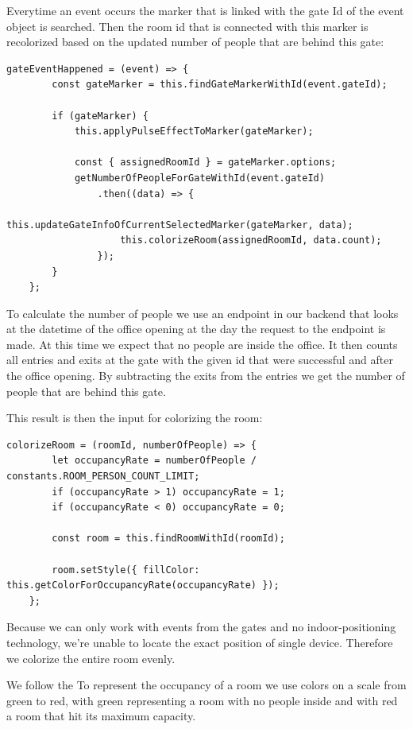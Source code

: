 Everytime an event occurs the marker that is linked with the gate Id of the event object is searched. Then the room id that is connected with this marker is recolorized based on the updated number of people that are behind this gate:

\begin{lstlisting}[label=gateEventHappened]
gateEventHappened = (event) => {
        const gateMarker = this.findGateMarkerWithId(event.gateId);

        if (gateMarker) {
            this.applyPulseEffectToMarker(gateMarker);

            const { assignedRoomId } = gateMarker.options;
            getNumberOfPeopleForGateWithId(event.gateId)
                .then((data) => {
                    this.updateGateInfoOfCurrentSelectedMarker(gateMarker, data);
                    this.colorizeRoom(assignedRoomId, data.count);
                });
        }
    };
\end{lstlisting}

To calculate the number of people we use an endpoint in our backend that looks at the datetime of the office opening at the day the request to the endpoint is made. At this time we expect that no people are inside the office. It then counts all entries and exits at the gate with the given id that were successful and after the office opening. By subtracting the exits from the entries we get the number of people that are behind this gate.

This result is then the input for colorizing the room:

\begin{lstlisting}[label=colorizeRoom]
	colorizeRoom = (roomId, numberOfPeople) => {
        let occupancyRate = numberOfPeople / constants.ROOM_PERSON_COUNT_LIMIT;
        if (occupancyRate > 1) occupancyRate = 1;
        if (occupancyRate < 0) occupancyRate = 0;

        const room = this.findRoomWithId(roomId);

        room.setStyle({ fillColor: this.getColorForOccupancyRate(occupancyRate) });
    };
\end{lstlisting}

Because we can only work with events from the gates and no indoor-positioning technology, we're unable to locate the exact position of single device. Therefore we colorize the entire room evenly.

We follow the To represent the occupancy of a room we use colors on a scale from green to red, with green representing a room with no people inside and with red a room that hit its maximum capacity. 

